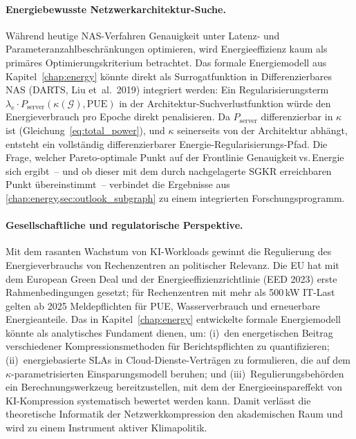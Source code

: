 ﻿\documentclass[12pt, a4paper, openany]{report}
\newcommand{\calG}{\mathcal{G}}
\begin{document}
\paragraph{Energiebewusste Netzwerkarchitektur-Suche.}
Während heutige NAS-Verfahren Genauigkeit unter Latenz- und
Parameteranzahlbeschränkungen optimieren, wird Energieeffizienz kaum
als primäres Optimierungskriterium betrachtet.  Das formale Energiemodell
aus Kapitel~\ref{chap:energy} könnte direkt als Surrogatfunktion in
Differenzierbares NAS (DARTS, Liu et~al.\ 2019) integriert werden:
Ein Regularisierungsterm $\lambda_{\mathrm{e}} \cdot P_{\mathrm{server}}(\kappa(\calG), \mathrm{PUE})$
in der Architektur-Suchverlustfunktion würde den Energieverbrauch
pro Epoche direkt penalisieren.  Da $P_{\mathrm{server}}$ differenzierbar in
$\kappa$ ist (Gleichung~\eqref{eq:total_power}), und $\kappa$ seinerseits
von der Architektur abhängt, entsteht ein vollständig differenzierbarer
Energie-Regularisierungs-Pfad.  Die Frage, welcher Pareto-optimale Punkt
auf der Frontlinie Genauigkeit\,vs.\,Energie sich ergibt~-- und ob dieser
mit dem durch nachgelagerte SGKR erreichbaren Punkt übereinstimmt~--
verbindet die Ergebnisse aus \cref{chap:energy,sec:outlook_subgraph} zu
einem integrierten Forschungsprogramm.

\paragraph{Gesellschaftliche und regulatorische Perspektive.}
Mit dem rasanten Wachstum von KI-Workloads gewinnt die Regulierung des
Energieverbrauchs von Rechenzentren an politischer Relevanz.  Die EU hat
mit dem European Green Deal und der Energieeffizienzrichtlinie (EED 2023)
erste Rahmenbedingungen gesetzt; für Rechenzentren mit mehr als 500\,kW
IT-Last gelten ab 2025 Meldepflichten für PUE, Wasserverbrauch und
erneuerbare Energieanteile.  Das in Kapitel~\ref{chap:energy} entwickelte
formale Energiemodell könnte als analytisches Fundament dienen, um:
(i)~den energetischen Beitrag verschiedener Kompressionsmethoden für
Berichtspflichten zu quantifizieren; (ii)~energiebasierte SLAs in
Cloud-Dienste-Verträgen zu formulieren, die auf dem
$\kappa$-parametrisierten Einsparungsmodell beruhen; und
(iii)~Regulierungsbehörden ein Berechnungswerkzeug bereitzustellen, mit
dem der Energieeinspareffekt von KI-Kompression systematisch bewertet
werden kann.  Damit verlässt die theoretische Informatik der
Netzwerkkompression den akademischen Raum und wird zu einem Instrument
aktiver Klimapolitik.
\end{document}
